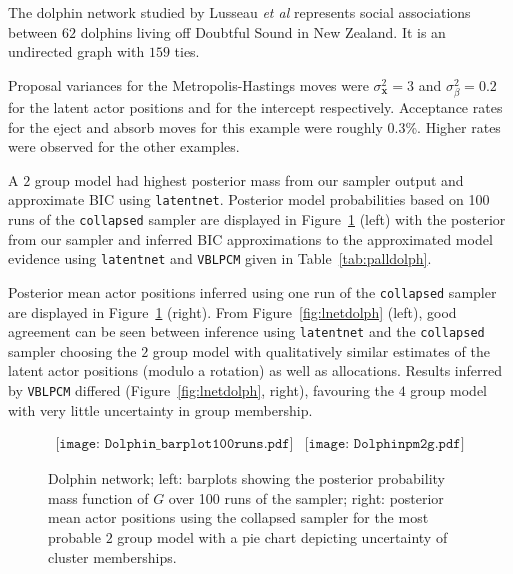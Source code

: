 \documentclass[12pt]{article}
\newcommand{\x}{{\mathbf{x}}}
\begin{document}
The dolphin network studied by Lusseau \textit{et al} \citeyear{lusseauetal03} represents social associations between $62$ dolphins living off Doubtful Sound in New Zealand. It is an undirected graph with $159$ ties.

Proposal variances for the Metropolis-Hastings moves were $\sigma^2_{\x}=3$ and $\sigma^2_{\beta}=0.2$ for the latent actor positions and for the intercept respectively. Acceptance rates for the eject and absorb moves for this example were roughly 0.3\%. Higher rates were observed for the other examples. 

A $2$ group model had highest posterior mass from our sampler output and approximate BIC using \texttt{latentnet}. Posterior model probabilities based on 100 runs of the \texttt{collapsed} sampler are displayed in Figure~\ref{fig:zmeanpiedolph} (left)
with the posterior from our sampler and inferred BIC approximations to the approximated model evidence using \texttt{latentnet} and \texttt{VBLPCM} given in Table~\ref{tab:palldolph}.  


Posterior mean actor positions inferred using one run of the \texttt{collapsed} sampler are displayed in Figure~\ref{fig:zmeanpiedolph} (right). 
From Figure~\ref{fig:lnetdolph} (left),  good agreement can be seen between inference using \texttt{latentnet} and the \texttt{collapsed} sampler choosing the $2$ group model with qualitatively similar estimates of the latent actor positions (modulo a rotation) as well as allocations. Results inferred by \texttt{VBLPCM} differed (Figure~\ref{fig:lnetdolph}, right), favouring the $4$ group model with very little uncertainty in group membership. 

\begin{figure}[htp]
 \begin{center}
\[
\begin{array}{cc}
 \texttt{[image: Dolphin\_barplot100runs.pdf]}
 & \texttt{[image: Dolphinpm2g.pdf]} %
\end{array}
\]
 \end{center}
 \caption{ Dolphin network; left: barplots showing the posterior probability mass function of $G$ over 100 runs of the sampler; right: posterior mean actor positions using the collapsed sampler for the most probable $2$ group model with a pie chart depicting uncertainty of cluster memberships.}
\label{fig:zmeanpiedolph}
\end{figure}
\end{document}

